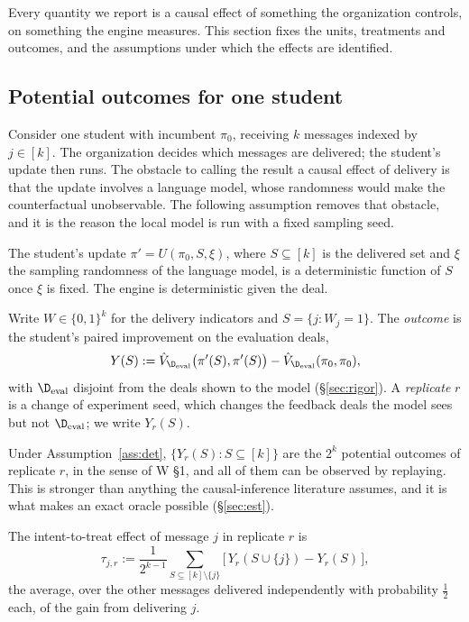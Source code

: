 \documentclass[11pt]{article}
\numberwithin{theorem}{section}
\theoremstyle{definition}
\theoremstyle{problemstyle}
\begin{document}
Every quantity we report is a causal effect of something the organization controls, on something the engine measures.
This section fixes the units, treatments and outcomes, and the assumptions under which the effects are identified.

\subsection{Potential outcomes for one student}

Consider one student with incumbent $\pi_0$, receiving $k$ messages indexed by $j\in[k]$. The organization decides
which messages are delivered; the student's update then runs. The obstacle to calling the result a causal effect of
delivery is that the update involves a language model, whose randomness would make the counterfactual unobservable.
The following assumption removes that obstacle, and it is the reason the local model is run with a fixed sampling seed.

\begin{ass}\label{ass:det}
The student's update $\pi' = U(\pi_0, S, \xi)$, where $S\subseteq[k]$ is the delivered set and $\xi$ the sampling
randomness of the language model, is a deterministic function of $S$ once $\xi$ is fixed. The engine is deterministic
given the deal.
\end{ass}

\begin{definition}
Write $W\in\{0,1\}^k$ for the delivery indicators and $S=\{j: W_j=1\}$. The \emph{outcome} is the student's paired
improvement on the evaluation deals,
\[
Y(S) := \hat V_{\D_{\mathrm{eval}}}\big(\pi'(S),\pi'(S)\big) - \hat V_{\D_{\mathrm{eval}}}(\pi_0,\pi_0),
\]
with $\D_{\mathrm{eval}}$ disjoint from the deals shown to the model (\S\ref{sec:rigor}). A \emph{replicate} $r$ is
a change of experiment seed, which changes the feedback deals the model sees but not $\D_{\mathrm{eval}}$; we write
$Y_r(S)$.
\end{definition}

Under Assumption~\ref{ass:det}, $\{Y_r(S): S\subseteq[k]\}$ are the $2^k$ potential outcomes of replicate $r$, in the
sense of W \S1, and all of them can be observed by replaying. This is stronger than anything the causal-inference
literature assumes, and it is what makes an exact oracle possible (\S\ref{sec:est}).

\begin{definition}\label{def:itt}
The intent-to-treat effect of message $j$ in replicate $r$ is
\[
\tau_{j,r} := \frac{1}{2^{k-1}}\sum_{S\subseteq[k]\setminus\{j\}}\big[\,Y_r(S\cup\{j\}) - Y_r(S)\,\big],
\]
the average, over the other messages delivered independently with probability $\tfrac12$ each, of the gain from
delivering $j$.
\end{definition}
\end{document}
